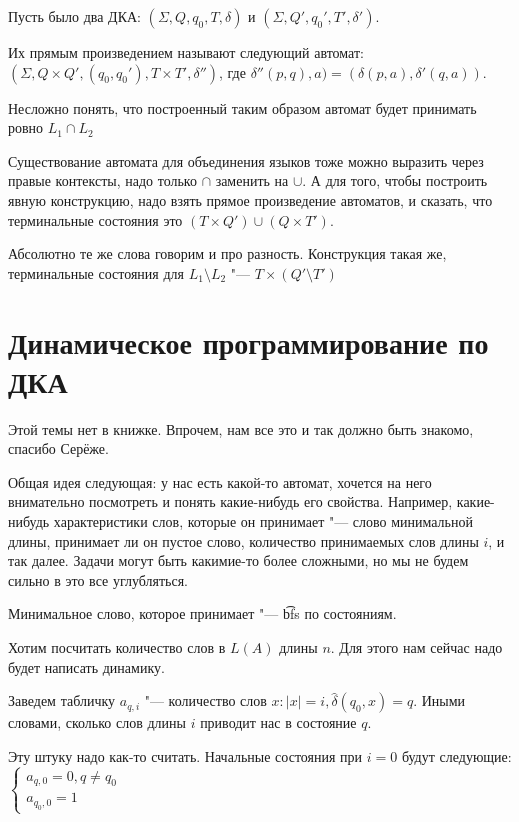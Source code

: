 \begin{Def}
Пусть было два ДКА: $(\Sigma, Q, q_0, T, \delta)$ и $(\Sigma, Q', q_0', T', \delta')$.

Их прямым произведением называют следующий автомат: $(\Sigma, Q \times Q', (q_0, q_0'), T \times T', \delta'')$, где $\delta''(p, q), a) = (\delta(p, a), \delta'(q, a))$.
\end{Def}
Несложно понять, что построенный таким образом автомат будет принимать ровно $L_1 \cap L_2$

Существование автомата для объединения языков тоже можно выразить через правые контексты, надо только $\cap$ заменить на $\cup$. 
А для того, чтобы построить явную конструкцию, надо взять прямое произведение автоматов, и сказать, что терминальные состояния это $(T \times Q') \cup (Q \times T')$.


Абсолютно те же слова говорим и про разность.
Конструкция такая же, терминальные состояния для $L_1 \setminus L_2$ "--- $T \times (Q' \setminus T')$


\section{Динамическое программирование по ДКА}
\begin{Rem}
Этой темы нет в книжке. Впрочем, нам все это и так должно быть знакомо, спасибо Серёже.
\end{Rem}

Общая идея следующая: у нас есть какой-то автомат, хочется на него внимательно посмотреть и понять какие-нибудь его свойства. 
Например, какие-нибудь характеристики слов, которые он принимает "--- слово минимальной длины, принимает ли он пустое слово, количество принимаемых слов длины $i$, и так далее.
Задачи могут быть какимие-то более сложными, но мы не будем сильно в это все углубляться.


Минимальное слово, которое принимает "--- \t{bfs} по состояниям.

Хотим посчитать количество слов в $L(A)$ длины $n$. Для этого нам сейчас надо будет написать динамику. 

Заведем табличку $a_{q, i}$ "--- количество слов $x: |x| = i, \hat \delta(q_0, x) = q$. 
Иными словами, сколько слов длины $i$ приводит нас в состояние $q$.

Эту штуку надо как-то считать. Начальные состояния при $i=0$ будут следующие:
$
    \begin{cases}
        a_{q, 0} = 0, q \neq q_0 \\
        a_{q_0, 0} = 1
    \end{cases} 
$

